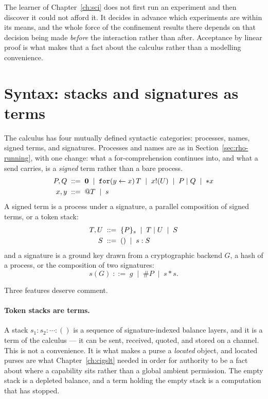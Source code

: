 \begin{remark}
\label{rmk:acceptance-shape}
The learner of Chapter~\ref{ch:sci} does not first run an experiment and
then discover it could not afford it.
It decides in advance which experiments are within its means, and the
whole force of the confinement results there depends on that decision
being made \emph{before} the interaction rather than after.
Acceptance by linear proof is what makes that a fact about the calculus
rather than a modelling convenience.
\end{remark}

\section{Syntax: stacks and signatures as terms}

The calculus has four mutually defined syntactic categories: processes,
names, signed terms, and signatures.
Processes and names are as in Section~\ref{sec:rho-running}, with one
change: what a for-comprehension continues into, and what a send carries,
is a \emph{signed} term rather than a bare process.
\begin{align}
  P, Q &\;::=\; \mathbf{0}
        \;\mid\; \mathtt{for}(y \leftarrow x)\,T
        \;\mid\; x!(U)
        \;\mid\; P \mid Q
        \;\mid\; {*}x \\
  x, y &\;::=\; @T \;\mid\; s
\end{align}
A signed term is a process under a signature, a parallel composition of
signed terms, or a token stack:
\begin{align}
  T, U &\;::=\; \{P\}_{s} \;\mid\; T \mid U \;\mid\; S \\
  S    &\;::=\; () \;\mid\; s : S
\end{align}
and a signature is a ground key drawn from a cryptographic backend $G$, a
hash of a process, or the composition of two signatures:
\[
  s(G) \;::=\; g \;\mid\; \#P \;\mid\; s \ast s .
\]

Three features deserve comment.

\paragraph{Token stacks are terms.}
A stack $s_1 : s_2 : \cdots : ()$ is a sequence of signature-indexed
balance layers, and it is a term of the calculus --- it can be sent,
received, quoted, and stored on a channel.
This is not a convenience.
It is what makes a purse a \emph{located} object, and located purses are
what Chapter~\ref{ch:cigslt} needed in order for authority to be a fact
about where a capability sits rather than a global ambient permission.
The empty stack is a depleted balance, and a term holding the empty stack
is a computation that has stopped.

